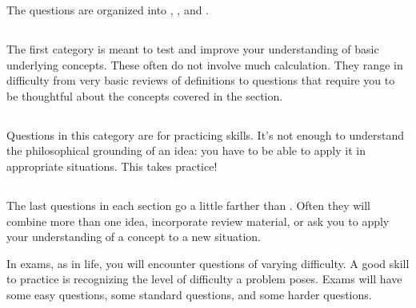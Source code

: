 The questions are organized into \Conceptual, \Procedural, and \Application. 

\subsection*{\Conceptual}The first category is meant to test and improve your understanding of basic underlying concepts. These often do not involve much calculation. They range in difficulty from very basic reviews of definitions to questions that require you to be thoughtful about the concepts covered in the section.

\subsection*{\Procedural} Questions in this category are for practicing skills. It's not enough to understand the philosophical grounding of an idea: you have to be able to apply it in appropriate situations. This takes practice!

\subsection*{\Application} The last questions in each section go a little farther than \Procedural. Often they will combine more than one idea, incorporate review material, or ask you to apply your understanding of a concept to a new situation.

In exams, as in life, you will encounter questions of varying difficulty. A good skill to practice is recognizing the level of difficulty a problem poses. Exams will have some easy questions, some standard questions, and some harder questions.

% 
% 
